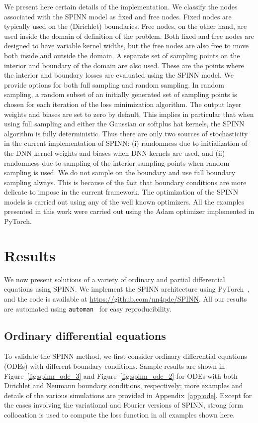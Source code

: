 \documentclass[12pt]{article}
\begin{document}
We present here certain details of the implementation. We classify the nodes associated with the SPINN model as fixed and free nodes. Fixed nodes are typically used on the (Dirichlet) boundaries. Free nodes, on the other hand, are used inside the domain of definition of the problem. Both fixed and free nodes are designed to have variable kernel widths, but the free nodes are also free to move both inside and outside the domain. A separate set of sampling points on the interior and boundary of the domain are also used. These are the points where the interior and boundary losses are evaluated using the SPINN model. We provide options for both full sampling and random sampling. In random sampling, a random subset of an initially generated set of sampling points is chosen for each iteration of the loss minimization algorithm. The output layer weights and biases are set to zero by default. This implies in particular that when using full sampling and either the Gaussian or softplus hat kernels, the SPINN algorithm is fully deterministic. Thus there are only two sources of stochasticity in the current implementation of SPINN: (i) randomness due to initialization of the DNN kernel weights and biases when DNN kernels are used, and (ii) randomness due to sampling of the interior sampling points when random sampling is used. We do not sample on the boundary and use full boundary sampling always. This is because of the fact that boundary conditions are more delicate to impose in the current framework. The optimization of the SPINN models is carried out using any of the well known optimizers. All the examples presented in this work were carried out using the Adam optimizer \cite{kingma2014} implemented in PyTorch.


\section{Results}
We now present solutions of a variety of ordinary and partial differential equations using SPINN. We implement the SPINN architecture using PyTorch~\cite{pytorch}, and the code is available at \url{https://github.com/nn4pde/SPINN}. All our results are automated using \verb|automan|~\cite{automan:2018} for easy reproducibility.

\subsection{Ordinary differential equations}
To validate the SPINN method, we first consider ordinary differential equations (ODEs) with different boundary conditions. Sample results are shown in Figure~\ref{fig:spinn_ode_3} and Figure~\ref{fig:spinn_ode_2} for ODEs with both Dirichlet and Neumann boundary conditions, respectively; more examples and details of the various simulations are provided in Appendix~\ref{app:ode}. Except for the cases involving the variational and Fourier versions of SPINN, strong form collocation is used to compute the loss function in all examples shown here.
\end{document}
